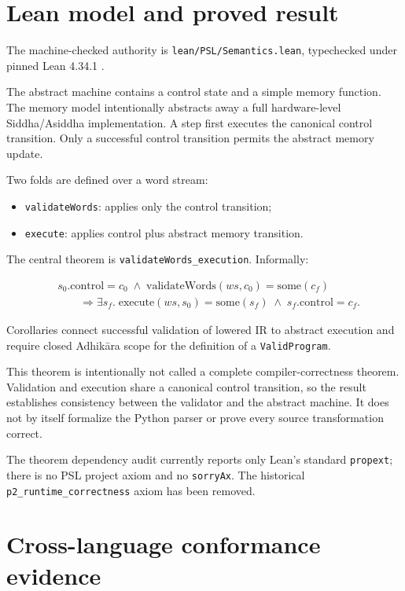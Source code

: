 \documentclass[11pt,a4paper]{article}
\begin{document}
\section{Lean model and proved result}

The machine-checked authority is
\texttt{lean/PSL/Semantics.lean}, typechecked under pinned Lean 4.34.1
\cite{moura2021lean4}.

The abstract machine contains a control state and a simple memory function.
The memory model intentionally abstracts away a full hardware-level
Siddha/Asiddha implementation. A step first executes the canonical control
transition. Only a successful control transition permits the abstract memory
update.

Two folds are defined over a word stream:

\begin{itemize}
\item \texttt{validateWords}: applies only the control transition;
\item \texttt{execute}: applies control plus abstract memory transition.
\end{itemize}

The central theorem is \texttt{validateWords\_execution}. Informally:

\[
\begin{split}
& s_0.\mathrm{control}=c_0 \;\land\;
\mathrm{validateWords}(ws,c_0)=\mathrm{some}(c_f) \\
& \qquad \Rightarrow
\exists s_f.\;
\mathrm{execute}(ws,s_0)=\mathrm{some}(s_f)
\;\land\;
s_f.\mathrm{control}=c_f.
\end{split}
\]

Corollaries connect successful validation of lowered IR to abstract execution
and require closed Adhik\={a}ra scope for the definition of a
\texttt{ValidProgram}.

This theorem is intentionally not called a complete compiler-correctness
theorem. Validation and execution share a canonical control transition, so
the result establishes consistency between the validator and the abstract
machine. It does not by itself formalize the Python parser or prove every
source transformation correct.

The theorem dependency audit currently reports only Lean's standard
\texttt{propext}; there is no PSL project axiom and no \texttt{sorryAx}.
The historical \texttt{p2\_runtime\_correctness} axiom has been removed.

\section{Cross-language conformance evidence}
\end{document}
